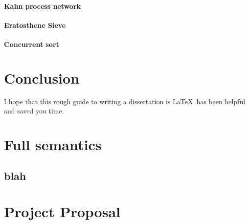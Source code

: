 \documentclass[12pt,twoside,notitlepage]{report}
\begin{document}
\subsubsection{Kahn process network}
\subsubsection{Eratosthene Sieve}
\subsubsection{Concurrent sort}
%

\cleardoublepage
\chapter{Conclusion}

I hope that this rough guide to writing a dissertation is \LaTeX\ has
been helpful and saved you time.




\cleardoublepage



\cleardoublepage

\appendix

\chapter{Full semantics}
\label{chap:fullsemantics}


\section{blah}









\cleardoublepage

\chapter{Project Proposal}


\end{document}
